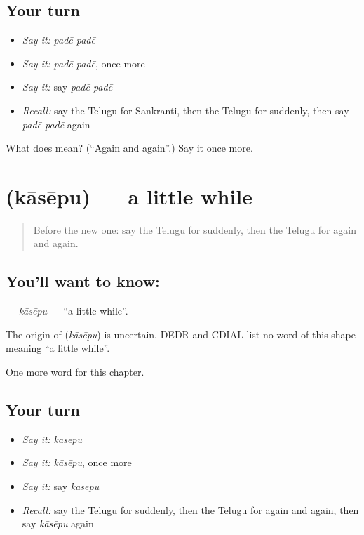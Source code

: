 \subsection*{Your turn}
\begin{itemize}
\raggedright
  \item \emph{Say it:} \emph{padē padē}
  \item \emph{Say it:} \emph{padē padē}, once more
  \item \emph{Say it:} say \emph{padē padē}
  \item \emph{Recall:} say the Telugu for Sankranti, then the Telugu for suddenly, then say \emph{padē padē} again
\end{itemize}

\begin{tcolorbox}[breakable,colback=teal!4,colframe=teal!35!black,title={Before you move on}]
What does   mean? (\textquotedblleft{}Again and again\textquotedblright{}.) Say it once more.
\end{tcolorbox}
\section[\texorpdfstring{\te{కాసేపు} (kāsēpu)}{కాసేపు (kāsēpu)}]{ (kāsēpu) — a little while}

\label{lesson:TE-C213-kasepu}



\begin{quote}
Before the new one: say the Telugu for suddenly, then the Telugu for again and again.
\end{quote}

\subsection*{You'll want to know: }
\textbf{} — \emph{kāsēpu} — \textquotedblleft{}a little while\textquotedblright{}.

\begin{cousinweb}
The origin of \textbf{} (\emph{kāsēpu}) is uncertain. DEDR and CDIAL list no word of this shape meaning \textquotedblleft{}a little while\textquotedblright{}.
\end{cousinweb}

\begin{grammarlens}[title={What you've built}]
One more word for this chapter.
\end{grammarlens}

\subsection*{Your turn}
\begin{itemize}
\raggedright
  \item \emph{Say it:} \emph{kāsēpu}
  \item \emph{Say it:} \emph{kāsēpu}, once more
  \item \emph{Say it:} say \emph{kāsēpu}
  \item \emph{Recall:} say the Telugu for suddenly, then the Telugu for again and again, then say \emph{kāsēpu} again
\end{itemize}

